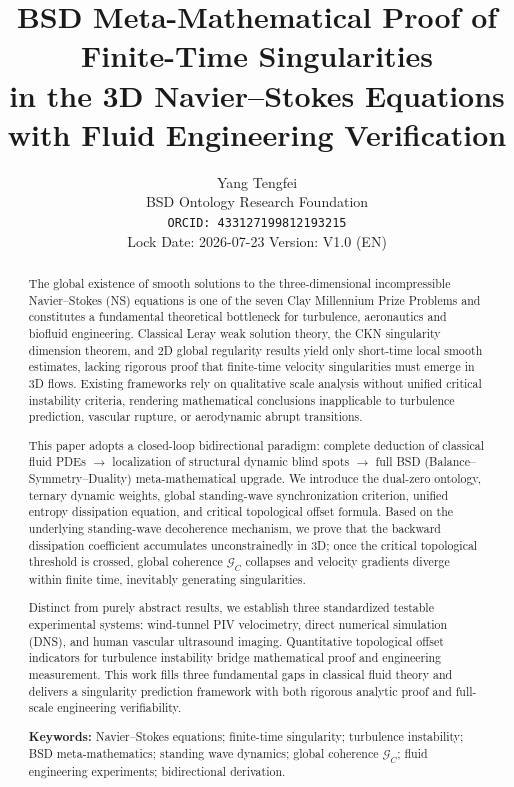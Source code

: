 \documentclass[11pt,a4paper]{article}
\title{\textbf{BSD Meta-Mathematical Proof of Finite-Time Singularities \\
in the 3D Navier--Stokes Equations with Fluid Engineering Verification}}
\author{Yang Tengfei \\
\small BSD Ontology Research Foundation \\
\small \texttt{ORCID: 433127199812193215} \\
\small Lock Date: 2026-07-23 \quad Version: V1.0 (EN)}
\date{}
\theoremstyle{remark}
\newcommand{\GC}{\mathcal{G}_{\!C}}
\begin{document}
\maketitle

\begin{abstract}
The global existence of smooth solutions to the three-dimensional incompressible Navier--Stokes (NS) equations is one of the seven Clay Millennium Prize Problems and constitutes a fundamental theoretical bottleneck for turbulence, aeronautics and biofluid engineering. Classical Leray weak solution theory, the CKN singularity dimension theorem, and 2D global regularity results yield only short-time local smooth estimates, lacking rigorous proof that finite-time velocity singularities must emerge in 3D flows. Existing frameworks rely on qualitative scale analysis without unified critical instability criteria, rendering mathematical conclusions inapplicable to turbulence prediction, vascular rupture, or aerodynamic abrupt transitions.

This paper adopts a closed-loop bidirectional paradigm: complete deduction of classical fluid PDEs $\to$ localization of structural dynamic blind spots $\to$ full BSD (Balance--Symmetry--Duality) meta-mathematical upgrade. We introduce the dual-zero ontology, ternary dynamic weights, global standing-wave synchronization criterion, unified entropy dissipation equation, and critical topological offset formula. Based on the underlying standing-wave decoherence mechanism, we prove that the backward dissipation coefficient accumulates unconstrainedly in 3D; once the critical topological threshold is crossed, global coherence $\GC$ collapses and velocity gradients diverge within finite time, inevitably generating singularities.

Distinct from purely abstract results, we establish three standardized testable experimental systems: wind-tunnel PIV velocimetry, direct numerical simulation (DNS), and human vascular ultrasound imaging. Quantitative topological offset indicators for turbulence instability bridge mathematical proof and engineering measurement. This work fills three fundamental gaps in classical fluid theory and delivers a singularity prediction framework with both rigorous analytic proof and full-scale engineering verifiability.

\medskip
\noindent\textbf{Keywords:} Navier--Stokes equations; finite-time singularity; turbulence instability; BSD meta-mathematics; standing wave dynamics; global coherence $\GC$; fluid engineering experiments; bidirectional derivation.
\end{abstract}
\end{document}
